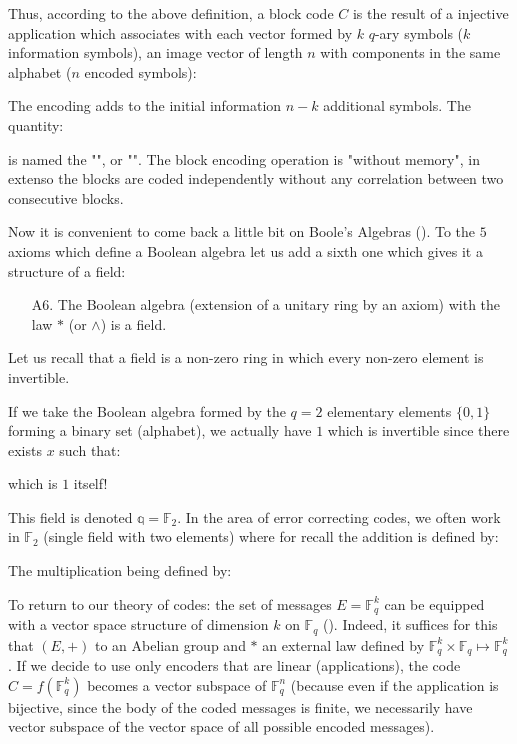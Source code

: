 	Thus, according to the above definition, a block code $C$ is the result of a injective application which associates with each vector formed by $k$ $q$-ary symbols ($k$ information symbols), an image vector of length $n$ with components in the same alphabet ($n$ encoded symbols):
	
	 The encoding adds to the initial information $n-k$ additional symbols. The quantity:
	
	is named the "", or "". The block encoding operation is "without memory", in extenso the blocks are coded independently without any correlation between two consecutive blocks.
	
	Now it is convenient to come back a little bit on Boole's Algebras (). To the $5$ axioms which define a Boolean algebra let us add a sixth one which gives it a structure of a field:
	\begin{enumerate}
		\item[A6.] The Boolean algebra (extension of a unitary ring by an axiom) with the law $*$ (or $\wedge$) is a field.
	\end{enumerate}
	\begin{tcolorbox}[title=Remark,colframe=black,arc=10pt]
	Let us recall that a field is a non-zero ring in which every non-zero element is invertible.
	\end{tcolorbox}
	If we take the Boolean algebra formed by the $q=2$ elementary elements $\{0,1\}$ forming a binary set (alphabet), we actually have $1$ which is invertible since there exists $x$ such that:
	
	which is $1$ itself!

	This field is denoted $\mathbb{q}=\mathbb{F}_2$. In the area of error correcting codes, we often work in $\mathbb{F}_2$ (single field with two elements) where for recall the addition is defined by:
	
	The multiplication being defined by:
	
	
	To return to our theory of codes: the set of messages $E=\mathbb{F}_q^k$ can be equipped with a vector space structure of dimension $k$ on $\mathbb{F}_q$ (). Indeed, it suffices for this that $(E, +)$ to an Abelian group and $*$ an external law defined by $\mathbb{F}_q^k\times \mathbb{F}_q\mapsto \mathbb{F}_q^k$. If we decide to use only encoders that are linear (applications), the code $C=f(\mathbb{F}_q^k)$ becomes a vector subspace of $\mathbb{F}_q^n$ (because even if the application is bijective, since the body of the coded messages is finite, we necessarily have vector subspace of the vector space of all possible encoded messages).
	
